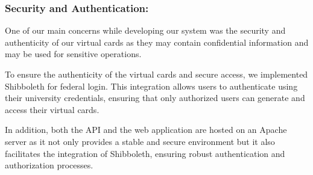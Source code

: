 \documentclass[12pt]{article}
\begin{document}
\subsubsection{Security and Authentication:}

One of our main concerns while developing our system was the security and authenticity of our virtual cards as they may contain confidential information and may be used for sensitive operations.

To ensure the authenticity of the virtual cards and secure access, we implemented Shibboleth for federal login. This integration allows users to authenticate using their university credentials, ensuring that only authorized users can generate and access their virtual cards.

In addition, both the API and the web application are hosted on an Apache server as it not only provides a stable and secure environment but it also facilitates the integration of Shibboleth, ensuring robust authentication and authorization processes.
\end{document}
